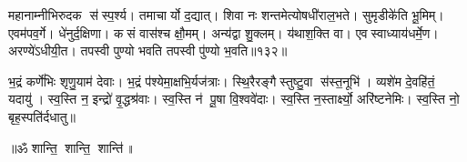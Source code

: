 महानाम्नीभिरुदक स॑स्प॒र्श्य। तमाचार्यो द॒द्यात्‌। 
शिवा नः शन्तमेत्योषधी॑राल॒भते। सुमृडीके॑ति भू॒मिम्‌। 
एवम॑पव॒र्गे। धे॑नुर्द॒क्षिणा। कसं वास॑श्च क्षौ॒मम्‌। 
अन्य॑द्वा शु॒क्लम्‌। य॑थाश॒क्ति वा। एवस्वाध्याय॑धर्मे॒ण। 
अरण्ये॑ऽधीयी॒त। तपस्वी पुण्यो भवति तपस्वी पु॑ण्यो भ॒वति॥१३२॥\anuvakamend


भ॒द्रं कर्णे॑भिः शृणु॒याम॑ देवाः। भ॒द्रं प॑श्येमा॒क्षभि॒र्यज॑त्राः। 
स्थि॒रैरङ्गैस्तुष्टु॒वा स॑स्त॒नूभि॑। व्यशे॑म दे॒वहि॑तं॒ यदायु॑। 
स्व॒स्ति न॒ इन्द्रो॑ वृ॒द्धश्र॑वाः। स्व॒स्ति न॑ पू॒षा वि॒श्ववे॑दाः। 
स्व॒स्ति न॒स्तार्क्ष्यो॒ अरि॑ष्टनेमिः। स्व॒स्ति नो॒ बृह॒स्पति॑र्दधातु॥\\

\centerline{॥ॐ शान्ति॒ शान्ति॒ शान्ति॑॥}
